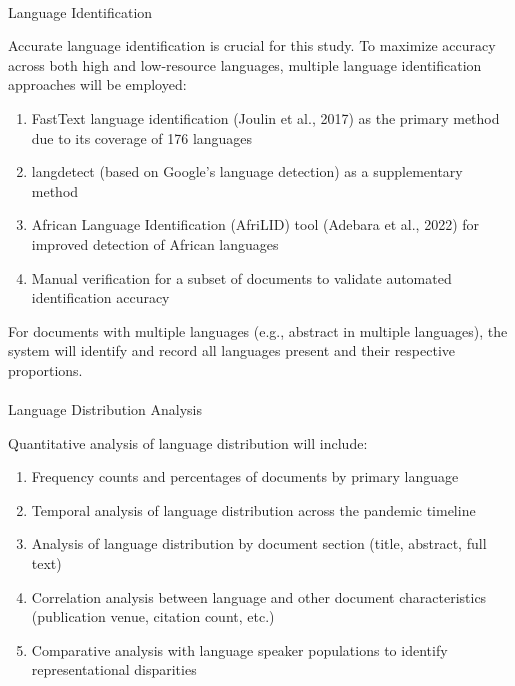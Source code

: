 \documentclass[
]{article}
\makeatletter
\let\oldparagraph\paragraph
\renewcommand{\paragraph}{
    \@ifstar
      \xxxParagraphStar
      \xxxParagraphNoStar
  }
\newcommand{\xxxParagraphStar}[1]{\oldparagraph*{#1}\mbox{}}
\newcommand{\xxxParagraphNoStar}[1]{\oldparagraph{#1}\mbox{}}
\providecommand{\tightlist}{%
  \setlength{\itemsep}{0pt}\setlength{\parskip}{0pt}}\usepackage{longtable,booktabs,array}
\makeatother
\begin{document}
\paragraph{Language Identification}\label{language-identification}

Accurate language identification is crucial for this study. To maximize
accuracy across both high and low-resource languages, multiple language
identification approaches will be employed:

\begin{enumerate}
\def\labelenumi{\arabic{enumi}.}
\tightlist
\item
  FastText language identification (Joulin et al., 2017) as the primary
  method due to its coverage of 176 languages
\item
  langdetect (based on Google's language detection) as a supplementary
  method
\item
  African Language Identification (AfriLID) tool (Adebara et al., 2022)
  for improved detection of African languages
\item
  Manual verification for a subset of documents to validate automated
  identification accuracy
\end{enumerate}

For documents with multiple languages (e.g., abstract in multiple
languages), the system will identify and record all languages present
and their respective proportions.

\paragraph{Language Distribution
Analysis}\label{language-distribution-analysis}

Quantitative analysis of language distribution will include:

\begin{enumerate}
\def\labelenumi{\arabic{enumi}.}
\tightlist
\item
  Frequency counts and percentages of documents by primary language
\item
  Temporal analysis of language distribution across the pandemic
  timeline
\item
  Analysis of language distribution by document section (title,
  abstract, full text)
\item
  Correlation analysis between language and other document
  characteristics (publication venue, citation count, etc.)
\item
  Comparative analysis with language speaker populations to identify
  representational disparities
\end{enumerate}
\end{document}
